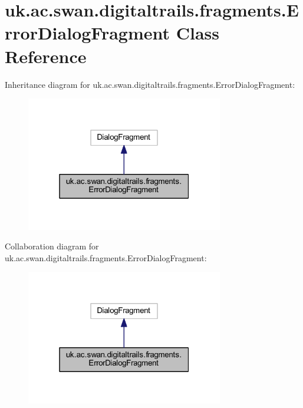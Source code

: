 \hypertarget{classuk_1_1ac_1_1swan_1_1digitaltrails_1_1fragments_1_1_error_dialog_fragment}{\section{uk.\+ac.\+swan.\+digitaltrails.\+fragments.\+Error\+Dialog\+Fragment Class Reference}
\label{classuk_1_1ac_1_1swan_1_1digitaltrails_1_1fragments_1_1_error_dialog_fragment}
}


Inheritance diagram for uk.\+ac.\+swan.\+digitaltrails.\+fragments.\+Error\+Dialog\+Fragment\+:\nopagebreak
\begin{figure}[H]
\begin{center}
\leavevmode
\includegraphics[width=244pt]{classuk_1_1ac_1_1swan_1_1digitaltrails_1_1fragments_1_1_error_dialog_fragment__inherit__graph}
\end{center}
\end{figure}


Collaboration diagram for uk.\+ac.\+swan.\+digitaltrails.\+fragments.\+Error\+Dialog\+Fragment\+:\nopagebreak
\begin{figure}[H]
\begin{center}
\leavevmode
\includegraphics[width=244pt]{classuk_1_1ac_1_1swan_1_1digitaltrails_1_1fragments_1_1_error_dialog_fragment__coll__graph}
\end{center}
\end{figure}
